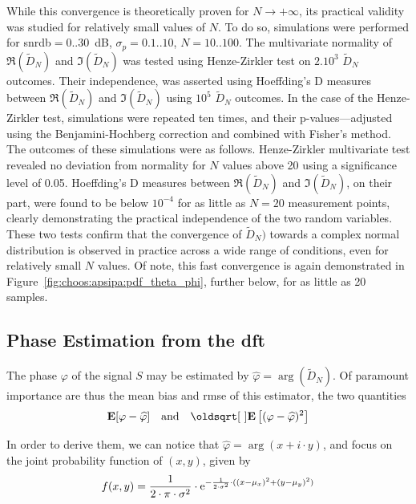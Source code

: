 \nocite{necronomicon}While this convergence is theoretically proven for $N\rightarrow + \infty$, its practical validity was studied for relatively small values of $N$. To do so, simulations were performed for \gls{snrdb}$=0..30$~dB, $\sigma_p=0.1..10${\degree}, $N=10..100$. The multivariate normality of $\Re{(\widetilde{D}_N)}$ and $\Im{(\widetilde{D}_N)}$ was tested using Henze-Zirkler test\cite{henze1990} on $2.10^3$ $\widetilde{D}_N$ outcomes. Their independence, was asserted using Hoeffding's D measures\cite{fujita2009} between $\Re{(\widetilde{D}_N)}$ and $\Im{(\widetilde{D}_N)}$ using $10^5$ $\widetilde{D}_N$ outcomes. In the case of the Henze-Zirkler test, simulations were repeated ten times, and their p-values---adjusted using the Benjamini-Hochberg correction\cite{benjamini1995} and combined with Fisher's method. The outcomes of these simulations were as follows. Henze-Zirkler multivariate test revealed no deviation from normality for $N$ values above 20 using a significance level of 0.05. Hoeffding's D measures between $\Re{(\widetilde{D}_N)}$ and $\Im{(\widetilde{D}_N)}$, on their part, were found to be below $10^{-4}$ for as little as $N=20$ measurement points, clearly demonstrating the practical independence of the two random variables. These two tests confirm that the convergence of $\widetilde{D}_N)$ towards a complex normal distribution is observed in practice across a wide range of conditions, even for relatively small $N$ values. Of note, this fast convergence is again demonstrated in Figure~\ref{fig:choos:apsipa:pdf_theta_phi}, further below, for as little as 20 samples.

\subsection{Phase Estimation from the \texorpdfstring{\gls{dft}}{DFT}}\label{sect:choos:apsipa:phase_est}

The phase $\varphi$ of the signal $S$ may be estimated by $\widehat{\varphi} = \arg(\widetilde{D}_N)$. Of paramount importance are thus the mean bias and \gls{rmse} of this estimator, \ie{} the two quantities
\begin{equation}
	\esp[\varphi - \widehat{\varphi}] \quad \text{and} \quad \sqrt{\esp\left[(\varphi - \widehat{\varphi})^2 \right]}
\end{equation}

In order to derive them, we can notice that $\widehat{\varphi}=\arg(x + i\cdot y)$, and focus on the joint probability function of $(x,y)$, given by
\begin{equation}
	f(x,y) = \frac{1}{2 \cdot \pi \cdot \sigma^2} \cdot \mathrm{e}^{-\frac{1}{2 \cdot \sigma^2}\cdot ((x - \mu_x)^2+(y-\mu_y)^2)}
\end{equation}

